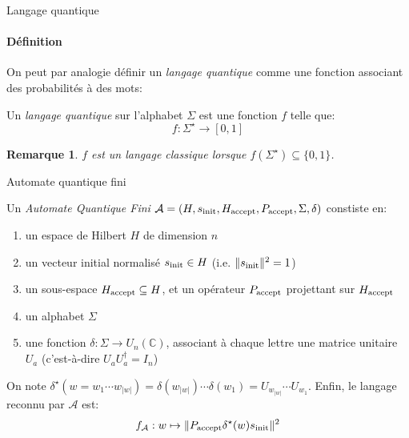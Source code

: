 \documentclass[aspectratio=169]{beamer}
\theoremstyle{plain}
\newtheorem*{remark}{Remarque}
\theoremstyle{definition}
\begin{document}
\begin{frame}{Langage quantique}
    \framesubtitle{Définition}
    On peut par analogie définir un \emph{langage quantique} comme une fonction associant des probabilités à des mots:
    \begin{definition}
        Un \emph{langage quantique} sur l'alphabet $\Sigma$ est une fonction $f$ telle que:
        \begin{equation*}
            f : \Sigma^\star \to [0, 1]
        \end{equation*}
        
    \end{definition}

    \begin{remark}
        $f$ est un langage classique lorsque $f(\Sigma^\star) \subseteq \{0, 1\}$.
    \end{remark}
\end{frame}

\begin{frame}{Automate quantique fini}
    \begin{definition}[AQF]
        Un \emph{Automate Quantique Fini} $\mathcal{A}=(H, s_{\textnormal{init}}, H_{\textnormal{accept}}, P_{\textnormal{accept}}, \Sigma, \delta)$ constiste en:
        \begin{enumerate}[label=--, noitemsep]
            \item un espace de Hilbert $H$ de dimension $n$
            \item un vecteur initial normalisé $s_{\textnormal{init}}\in H$ (i.e. $\|s_{\textnormal{init}}\|^2=1$)
            \item un sous-espace $H_{\textnormal{accept}} \subseteq H$, et un opérateur $P_{\textnormal{accept}}$ projettant sur $H_{\textnormal{accept}}$
            \item un alphabet $\Sigma$
            \item une fonction $\delta : \Sigma \to U_n(\mathbb{C})$, associant à chaque lettre une matrice unitaire $U_a$ (c'est-à-dire $U_aU_a^\dagger = I_n$)
        \end{enumerate}
        
        On note $\delta^\star(w=w_1\cdots w_{|w|}) = \delta(w_{|w|})\cdots \delta(w_1) = U_{w_{|w|}}\cdots U_{w_1}$. Enfin, le langage reconnu par $\mathcal{A}$ est:
        \begin{equation*}
            f_{\mathcal{A}} : w \mapsto \|P_{\textnormal{accept}}\delta^\star(w)s_{\textnormal{init}}\|^2
        \end{equation*}
    \end{definition}
\end{frame}
\end{document}
